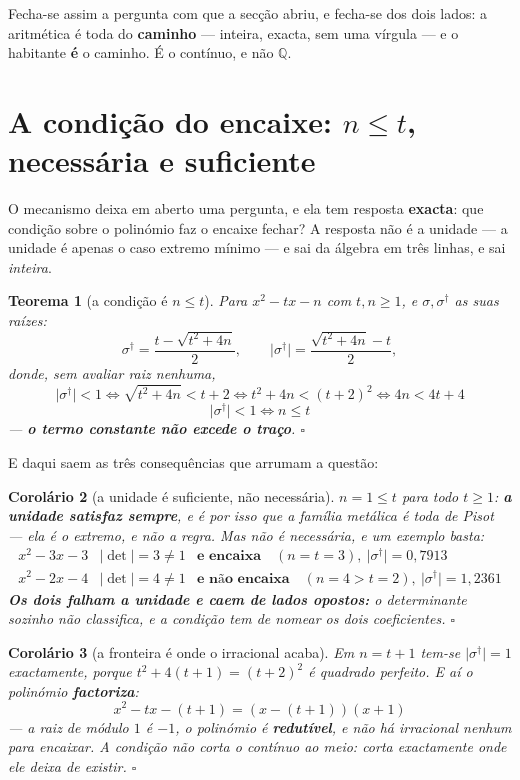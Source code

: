 \documentclass[11pt,a4paper]{article}
\newtheorem{teorema}{Teorema}
\newtheorem{corolario}[teorema]{Corolário}
\newcommand{\abs}[1]{\lvert #1\rvert}
\newcommand{\dg}{^{\dagger}}
\begin{document}
\medskip
\noindent Fecha-se assim a pergunta com que a secção abriu, e fecha-se dos dois
lados: a aritmética é toda do \textbf{caminho} --- inteira, exacta, sem uma
vírgula --- e o habitante \textbf{é} o caminho. É o contínuo, e não $\mathbb{Q}$.

\section{A condição do encaixe: $n\leq t$, necessária e suficiente}\label{sec:contra}

O mecanismo deixa em aberto uma pergunta, e ela tem resposta \textbf{exacta}: que
condição sobre o polinómio faz o encaixe fechar? A resposta não é a unidade --- a
unidade é apenas o caso extremo mínimo --- e sai da álgebra em três linhas, e sai
\emph{inteira}.

\begin{teorema}[a condição é $n\leq t$]\label{thm:condicao}
Para $x^{2}-tx-n$ com $t,n\geq1$, e $\sigma,\sigma\dg$ as suas raízes:
\[
\sigma\dg=\frac{t-\sqrt{t^{2}+4n}}{2},\qquad
\abs{\sigma\dg}=\frac{\sqrt{t^{2}+4n}-t}{2},
\]
donde, sem avaliar raiz nenhuma,
\[
\abs{\sigma\dg}<1
\iff \sqrt{t^{2}+4n}<t+2
\iff t^{2}+4n<(t+2)^{2}
\iff 4n<4t+4
\]
\[
\boxed{\;\abs{\sigma\dg}<1\iff n\leq t\;}
\]
--- \textbf{o termo constante não excede o traço}. $\square$
\end{teorema}

\noindent E daqui saem as três consequências que arrumam a questão:

\begin{corolario}[a unidade é suficiente, não necessária]\label{cor:unidade}
$n=1\leq t$ para todo $t\geq1$: \textbf{a unidade satisfaz sempre}, e é por isso
que a família metálica é toda de Pisot --- ela é o \emph{extremo}, e não a regra.
Mas não é necessária, e um exemplo basta:
\[
\boxed{
\begin{array}{lll}
x^{2}-3x-3 & \abs{\det}=3\neq1 & \textbf{e encaixa}\quad(n=t=3),\ \abs{\sigma\dg}=0{,}7913\\[3pt]
x^{2}-2x-4 & \abs{\det}=4\neq1 & \textbf{e não encaixa}\quad(n=4>t=2),\ \abs{\sigma\dg}=1{,}2361
\end{array}}
\]
\textbf{Os dois falham a unidade e caem de lados opostos:} o determinante sozinho
não classifica, e a condição tem de nomear os \emph{dois} coeficientes. $\square$
\end{corolario}

\begin{corolario}[a fronteira é onde o irracional acaba]\label{cor:fronteira}
Em $n=t+1$ tem-se $\abs{\sigma\dg}=1$ \emph{exactamente}, porque
$t^{2}+4(t+1)=(t+2)^{2}$ é quadrado perfeito. E aí o polinómio \textbf{factoriza}:
\[
\boxed{\;x^{2}-tx-(t+1)=(x-(t+1))(x+1)\;}
\]
--- a raiz de módulo $1$ é $-1$, o polinómio é \textbf{redutível}, e não há
irracional nenhum para encaixar. \emph{A condição não corta o contínuo ao meio:
corta exactamente onde ele deixa de existir.} $\square$
\end{corolario}
\end{document}
